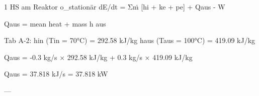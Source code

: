 1 HS am Reaktor  
o\_stationär  
dE/dt = Σṁ [hi + ke + pe] + Qaus - W  

Qaus = mean heat + mass h aus  

Tab A-2:  
hin (Tin = 70°C) = 292.58 kJ/kg  
haus (Taus = 100°C) = 419.09 kJ/kg  

Qaus = -0.3 kg/s × 292.58 kJ/kg + 0.3 kg/s × 419.09 kJ/kg  

Qaus = 37.818 kJ/s = 37.818 kW  

---